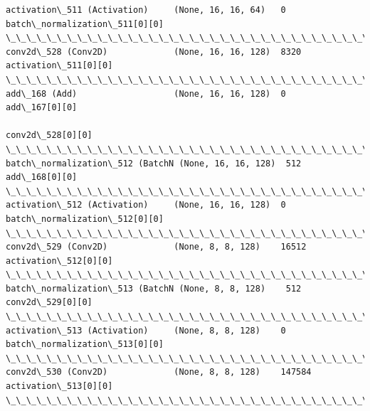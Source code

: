 \documentclass[11pt]{article}
\begin{document}
\begin{Verbatim}[commandchars=\\\{\}]
activation\_511 (Activation)     (None, 16, 16, 64)   0           batch\_normalization\_511[0][0]    
\_\_\_\_\_\_\_\_\_\_\_\_\_\_\_\_\_\_\_\_\_\_\_\_\_\_\_\_\_\_\_\_\_\_\_\_\_\_\_\_\_\_\_\_\_\_\_\_\_\_\_\_\_\_\_\_\_\_\_\_\_\_\_\_\_\_\_\_\_\_\_\_\_\_\_\_\_\_\_\_\_\_\_\_\_\_\_\_\_\_\_\_\_\_\_\_\_\_
conv2d\_528 (Conv2D)             (None, 16, 16, 128)  8320        activation\_511[0][0]             
\_\_\_\_\_\_\_\_\_\_\_\_\_\_\_\_\_\_\_\_\_\_\_\_\_\_\_\_\_\_\_\_\_\_\_\_\_\_\_\_\_\_\_\_\_\_\_\_\_\_\_\_\_\_\_\_\_\_\_\_\_\_\_\_\_\_\_\_\_\_\_\_\_\_\_\_\_\_\_\_\_\_\_\_\_\_\_\_\_\_\_\_\_\_\_\_\_\_
add\_168 (Add)                   (None, 16, 16, 128)  0           add\_167[0][0]                    
                                                                 conv2d\_528[0][0]                 
\_\_\_\_\_\_\_\_\_\_\_\_\_\_\_\_\_\_\_\_\_\_\_\_\_\_\_\_\_\_\_\_\_\_\_\_\_\_\_\_\_\_\_\_\_\_\_\_\_\_\_\_\_\_\_\_\_\_\_\_\_\_\_\_\_\_\_\_\_\_\_\_\_\_\_\_\_\_\_\_\_\_\_\_\_\_\_\_\_\_\_\_\_\_\_\_\_\_
batch\_normalization\_512 (BatchN (None, 16, 16, 128)  512         add\_168[0][0]                    
\_\_\_\_\_\_\_\_\_\_\_\_\_\_\_\_\_\_\_\_\_\_\_\_\_\_\_\_\_\_\_\_\_\_\_\_\_\_\_\_\_\_\_\_\_\_\_\_\_\_\_\_\_\_\_\_\_\_\_\_\_\_\_\_\_\_\_\_\_\_\_\_\_\_\_\_\_\_\_\_\_\_\_\_\_\_\_\_\_\_\_\_\_\_\_\_\_\_
activation\_512 (Activation)     (None, 16, 16, 128)  0           batch\_normalization\_512[0][0]    
\_\_\_\_\_\_\_\_\_\_\_\_\_\_\_\_\_\_\_\_\_\_\_\_\_\_\_\_\_\_\_\_\_\_\_\_\_\_\_\_\_\_\_\_\_\_\_\_\_\_\_\_\_\_\_\_\_\_\_\_\_\_\_\_\_\_\_\_\_\_\_\_\_\_\_\_\_\_\_\_\_\_\_\_\_\_\_\_\_\_\_\_\_\_\_\_\_\_
conv2d\_529 (Conv2D)             (None, 8, 8, 128)    16512       activation\_512[0][0]             
\_\_\_\_\_\_\_\_\_\_\_\_\_\_\_\_\_\_\_\_\_\_\_\_\_\_\_\_\_\_\_\_\_\_\_\_\_\_\_\_\_\_\_\_\_\_\_\_\_\_\_\_\_\_\_\_\_\_\_\_\_\_\_\_\_\_\_\_\_\_\_\_\_\_\_\_\_\_\_\_\_\_\_\_\_\_\_\_\_\_\_\_\_\_\_\_\_\_
batch\_normalization\_513 (BatchN (None, 8, 8, 128)    512         conv2d\_529[0][0]                 
\_\_\_\_\_\_\_\_\_\_\_\_\_\_\_\_\_\_\_\_\_\_\_\_\_\_\_\_\_\_\_\_\_\_\_\_\_\_\_\_\_\_\_\_\_\_\_\_\_\_\_\_\_\_\_\_\_\_\_\_\_\_\_\_\_\_\_\_\_\_\_\_\_\_\_\_\_\_\_\_\_\_\_\_\_\_\_\_\_\_\_\_\_\_\_\_\_\_
activation\_513 (Activation)     (None, 8, 8, 128)    0           batch\_normalization\_513[0][0]    
\_\_\_\_\_\_\_\_\_\_\_\_\_\_\_\_\_\_\_\_\_\_\_\_\_\_\_\_\_\_\_\_\_\_\_\_\_\_\_\_\_\_\_\_\_\_\_\_\_\_\_\_\_\_\_\_\_\_\_\_\_\_\_\_\_\_\_\_\_\_\_\_\_\_\_\_\_\_\_\_\_\_\_\_\_\_\_\_\_\_\_\_\_\_\_\_\_\_
conv2d\_530 (Conv2D)             (None, 8, 8, 128)    147584      activation\_513[0][0]             
\_\_\_\_\_\_\_\_\_\_\_\_\_\_\_\_\_\_\_\_\_\_\_\_\_\_\_\_\_\_\_\_\_\_\_\_\_\_\_\_\_\_\_\_\_\_\_\_\_\_\_\_\_\_\_\_\_\_\_\_\_\_\_\_\_\_\_\_\_\_\_\_\_\_\_\_\_\_\_\_\_\_\_\_\_\_\_\_\_\_\_\_\_\_\_\_\_\_

\end{Verbatim}
\end{document}
